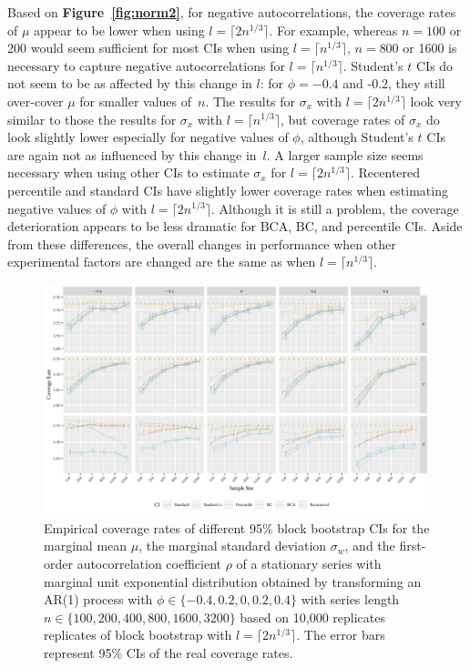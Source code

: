 \documentclass[10pt]{article}
\newcommand{\jy}[1]{\textcolor{blue}{JY: #1}}
\newcommand{\mc}[1]{\textcolor{orange}{MC: (#1)}}
\begin{document}
Based on \textbf{Figure~\ref{fig:norm2}}, for negative autocorrelations, the 
coverage 
rates of $\mu$ appear to be lower when
using $l = \lceil 2n^{1/3} \rceil$. For example, whereas $n = 100$ or 200 
would seem sufficient for most CIs when using $l = \lceil n^{1/3} \rceil$, 
$n = 800$ or 1600 is necessary to capture negative autocorrelations for 
$l = \lceil n^{1/3} \rceil$. Student's $t$ CIs do not seem to be as affected
by this change in $l$: for $\phi = -0.4$ and -0.2, they still over-cover $\mu$
for smaller values of~$n$. The results for $\sigma_x$ with $l = \lceil 2n^{1/3} 
\rceil$ look very similar to 
those the results for $\sigma_x$ with $l = \lceil n^{1/3} \rceil$, but coverage 
rates of $\sigma_x$ do look slightly lower
especially for negative values of $\phi$, although Student's $t$ CIs are again
not as influenced by this change in~$l$. A larger sample size seems necessary
when using other CIs to estimate $\sigma_x$ for $l = \lceil 2n^{1/3} \rceil$.
Recentered percentile and standard CIs have slightly lower coverage rates when
estimating negative values of $\phi$ with $l = \lceil 2n^{1/3} \rceil$. 
Although it is still a problem, the coverage deterioration appears to be less 
dramatic for BCA,
BC, and percentile CIs. Aside from these differences, the overall changes
in performance when other experimental factors are changed are the same as
when $l = \lceil n^{1/3} \rceil$.

\begin{figure}[tbp]
  \centering
  \includegraphics[width=\textwidth]{figures/alt_plot_exp2}
  \caption{Empirical coverage rates of different 95\% block bootstrap CIs for
    the marginal mean $\mu$, the marginal standard deviation $\sigma_w$, and
    the first-order autocorrelation coefficient $\rho$ of a stationary series 
    with 
    marginal unit exponential distribution obtained by transforming an AR(1) 
    process
    with $\phi \in \{-0.4, 0.2, 0, 0.2, 0.4\}$ with series length 
    $n \in \{100, 200, 400, 800, 1600, 3200\}$ based on 10,000 replicates 
    replicates of
    block bootstrap with $l = \lceil 2n^{1/3} \rceil$. 
    The error bars represent 95\% CIs of the real coverage rates.}
  \label{fig:exp2}
\end{figure}
\end{document}
